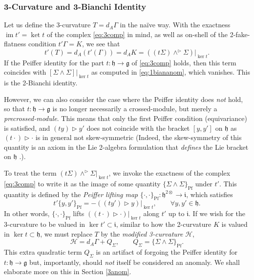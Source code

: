 \documentclass[onecolumn]{article}
\theoremstyle{theorem}
\theoremstyle{remark}
\theoremstyle{example}
\theoremstyle{definition}
\numberwithin{equation}{section}
\def\ker{\operatorname{ker}}
\def\g{\mathfrak g}
\def\h{\mathfrak h}
\begin{document}
\subsubsection{3-Curvature and 3-Bianchi Identity}

Let us define the 3-curvature $T=d_A\Gamma$ in the na{\" i}ve way. With the exactness $\operatorname{im}t'=\operatorname{ket}t$ of the complex  \eqref{eq:3comp} in mind, as well as on-shell of the 2-fake-flatness condition $t'\Gamma=K$, we see that
\begin{equation}
    t'(T) = d_A(t'(\Gamma)) = d_AK = ((t\Sigma)\wedge^\rhd \Sigma)|_{\operatorname{ker}t}.\nonumber
\end{equation}
{If} the Peiffer identity for the part $t:\mathfrak{h}\rightarrow\mathfrak{g}$ of  \eqref{eq:3comp} holds, then this term coincides with $[\Sigma\wedge\Sigma]|_{\operatorname{ker}t}$ as computed in  \eqref{eq:1biananom}, which vanishes. This is the 2-Bianchi identity.

However, we can also consider the case where the Peiffer identity does \textit{{not}} hold, so that  $t:\mathfrak{h}\rightarrow\mathfrak{g}$ is no longer necessarily a crossed-module, but merely a {\it {precrossed-module}}. This means that only the first Peiffer condition (equivariance) is satisfied, and $(ty)\rhd y'$ does not coincide with the bracket $[y,y']$ on $\mathfrak{h}$ as $(t\cdot)\rhd \cdot$ is in general not skew-symmetric {(Indeed, the skew-symmetry of this quantity is an axiom in the Lie 2-algebra formulation that} {\it {defines}} {the Lie bracket on $\mathfrak{h}$} \cite{Bai_2013}.).

To treat the term $(t\Sigma)\wedge^\rhd\Sigma|_{\operatorname{ker}t}$, we invoke the exactness of the complex  \eqref{eq:3comp} to write it as the image of some quantity $\{\Sigma\wedge\Sigma\}_\text{Pf}$ under $t'$. This quantity is defined by the {\it {Peiffer lifting map}} $\{\cdot,\cdot\}_\text{Pf}:\mathfrak{h}^{2\otimes}\rightarrow \mathfrak{i}$, which satisfies
\begin{equation}
    t'\{y,y'\}_\text{Pf} = -((ty')\rhd y)|_{\operatorname{ker}t},\qquad \forall y,y'\in\h.\label{liftcond}
\end{equation}
{In} other words, $\{\cdot,\cdot\}_\text{Pf}$ lifts $((t\cdot)\rhd \cdot)|_{\ker t}$ along $t'$ up to $\mathfrak{i}$. If we wish for the 3-curvature to be valued in $\operatorname{ker}t'\subset\mathfrak{i}$, similar to how the 2-curvature $K$ is valued in $\operatorname{ker}t\subset\mathfrak{h}$, we must replace $T$ by the {\it {modified 3-curvature}} $\mathcal{H}$,
\begin{equation}
    \mathcal{H} = d_A\Gamma + Q_\Sigma,\qquad Q_\Sigma = \{\Sigma\wedge\Sigma\}_\text{Pf}.\label{eq:3curv}
\end{equation}
{This} extra quadratic term $Q_\Sigma$ is an artifact of forgoing the Peiffer identity for $t:\h\rightarrow \g$ but, importantly, {should \textit{{not}} itself be considered an anomaly}. We shall elaborate more on this in Section \ref{3anom}.
\end{document}
